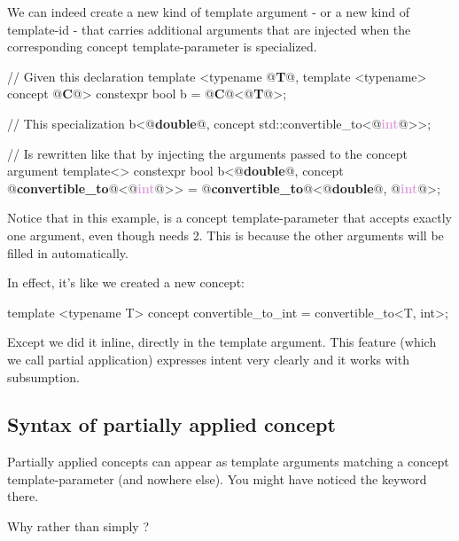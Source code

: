 \documentclass{wg21}
\begin{document}
We can indeed create a new kind of template argument - or a new kind of template-id - that carries additional arguments that are injected
when the corresponding concept template-parameter is specialized.
\begin{colorblock}
// Given this declaration
template <typename @\textbf{\textcolor{OliveGreen}{T}}@, template <typename> concept @\textbf{\textcolor{WildStrawberry}{C}}@>
constexpr bool b = @\textbf{\textcolor{WildStrawberry}{C}}@<@\textbf{\textcolor{OliveGreen}{T}}@>;

// This specialization
b<@\textbf{\textcolor{OliveGreen}{double}}@, concept std::convertible_to<@\textbf{\textcolor{Plum}{int}}@>>;

// Is rewritten like that by injecting the arguments passed to the concept argument
template<>
constexpr bool b<@\textbf{\textcolor{OliveGreen}{double}}@, concept @\textbf{\textcolor{WildStrawberry}{convertible_to}}@<@\textbf{\textcolor{Plum}{int}}@>> = @\textbf{\textcolor{WildStrawberry}{convertible_to}}@<@\textbf{\textcolor{OliveGreen}{double}}@, @\textbf{\textcolor{Plum}{int}}@>;
\end{colorblock}

Notice that in this example,  is a concept template-parameter that accepts exactly one argument,
even though  needs 2.
This is because the other arguments will be filled in automatically.

In effect, it's like we created a new concept:

\begin{colorblock}
template <typename T>
concept convertible_to_int = convertible_to<T, int>;
\end{colorblock}

Except we did it inline, directly in the template argument.
This feature (which we call partial application) expresses intent very clearly and it works with subsumption.

\subsection{Syntax of partially applied concept}

Partially applied concepts can appear as template arguments matching a concept template-parameter (and nowhere else).
You might have noticed the  keyword there.

Why  rather than simply ?
\end{document}
